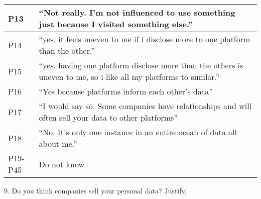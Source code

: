 \begin{table}[H]
\begin{longtable}{p{3cm} p{13cm}}
        \hline
        P13 & ``Not really. I'm not influenced to use something just because I visited something else.'' \\
        \hline
        P14 & ``yes. it feels uneven to me if i disclose more to one platform than the other.'' \\
        \hline
        P15 & ``yes. having one platform disclose more than the others is uneven to me, so i like all my platforms to similar.'' \\
        \hline
        P16 & ``Yes because platforms inform each other's data'' \\
        \hline
        P17 & ``I would say so. Some companies have relationships and will often sell your data to other platforms'' \\
        \hline
        P18 & ``No. It's only one instance in an entire ocean of data all about me.'' \\
        \hline
        P19-P45 & Do not know \\
        \hline
    \end{longtable}
\end{table}

9. Do you think companies sell your personal data? Justify.

